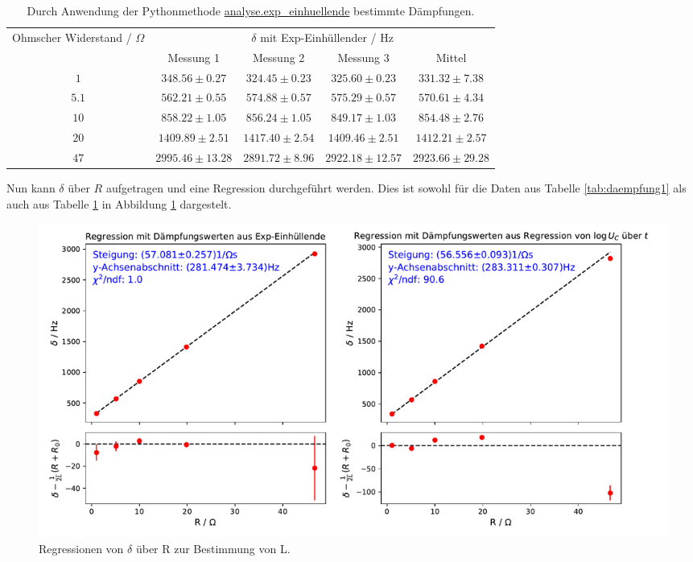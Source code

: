 \documentclass[a4paper, 12pt]{scrartcl}
\begin{document}
\begin{table}[H]
\centering
\begin{adjustbox}{width=\textwidth}
\begin{tabular}{c|cccc}
\multirow{2}{*}{Ohmscher Widerstand / $\Omega$} & \multicolumn{4}{c}{$\delta$ mit Exp-Einhüllender / Hz} \\
\cline{2-5}
& Messung 1 & Messung 2 & Messung 3 & Mittel\\
\hline
$1$ & $348.56 \pm 0.27$ & $324.45\pm 0.23$ & $325.60\pm 0.23$ & $331.32\pm 7.38$ \\
$5.1$ & $562.21 \pm 0.55$ & $574.88\pm 0.57$ & $575.29\pm 0.57$ & $570.61\pm 4.34$ \\
$10$ & $858.22 \pm 1.05$ & $856.24\pm 1.05$ & $849.17\pm 1.03$ & $854.48\pm 2.76$ \\
$20$ & $1409.89 \pm 2.51$ & $1417.40\pm 2.54$ & $1409.46\pm 2.51$ & $1412.21\pm 2.57$ \\
$47$ & $2995.46 \pm 13.28$ & $2891.72\pm 8.96$ & $2922.18\pm 12.57$ & $2923.66\pm 29.28$
\end{tabular}
\end{adjustbox}
\caption{Durch Anwendung der Pythonmethode \url{analyse.exp_einhuellende} bestimmte Dämpfungen.}
\label{tab:daempfung2}
\end{table}

Nun kann $\delta$ über $R$ aufgetragen und eine Regression durchgeführt werden. Dies ist sowohl für die Daten aus Tabelle \ref{tab:daempfung1} als auch aus Tabelle \ref{tab:daempfung2} in Abbildung \ref{abb:reg_Rdelta} dargestelt.

\begin{figure}[H]
\centering
\includegraphics[width=\textwidth]{plots/reg_delR.pdf}
\caption{Regressionen von $\delta$ über R zur Bestimmung von L.}
\label{abb:reg_Rdelta}
\end{figure}
\end{document}
